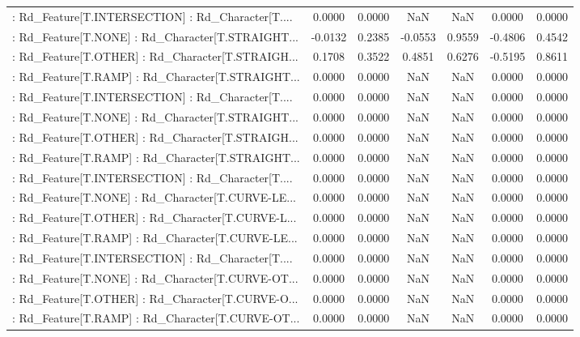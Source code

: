 \begin{longtable}{p{4cm}cccccc}
 : Rd\_Feature[T.INTERSECTION] : Rd\_Character[T.... &  0.0000 &    0.0000 &     NaN &          NaN &  0.0000 &  0.0000 \\
 : Rd\_Feature[T.NONE] : Rd\_Character[T.STRAIGHT... & -0.0132 &    0.2385 & -0.0553 &       0.9559 & -0.4806 &  0.4542 \\
 : Rd\_Feature[T.OTHER] : Rd\_Character[T.STRAIGH... &  0.1708 &    0.3522 &  0.4851 &       0.6276 & -0.5195 &  0.8611 \\
 : Rd\_Feature[T.RAMP] : Rd\_Character[T.STRAIGHT... &  0.0000 &    0.0000 &     NaN &          NaN &  0.0000 &  0.0000 \\
 : Rd\_Feature[T.INTERSECTION] : Rd\_Character[T.... &  0.0000 &    0.0000 &     NaN &          NaN &  0.0000 &  0.0000 \\
 : Rd\_Feature[T.NONE] : Rd\_Character[T.STRAIGHT... &  0.0000 &    0.0000 &     NaN &          NaN &  0.0000 &  0.0000 \\
 : Rd\_Feature[T.OTHER] : Rd\_Character[T.STRAIGH... &  0.0000 &    0.0000 &     NaN &          NaN &  0.0000 &  0.0000 \\
 : Rd\_Feature[T.RAMP] : Rd\_Character[T.STRAIGHT... &  0.0000 &    0.0000 &     NaN &          NaN &  0.0000 &  0.0000 \\
 : Rd\_Feature[T.INTERSECTION] : Rd\_Character[T.... &  0.0000 &    0.0000 &     NaN &          NaN &  0.0000 &  0.0000 \\
 : Rd\_Feature[T.NONE] : Rd\_Character[T.CURVE-LE... &  0.0000 &    0.0000 &     NaN &          NaN &  0.0000 &  0.0000 \\
 : Rd\_Feature[T.OTHER] : Rd\_Character[T.CURVE-L... &  0.0000 &    0.0000 &     NaN &          NaN &  0.0000 &  0.0000 \\
 : Rd\_Feature[T.RAMP] : Rd\_Character[T.CURVE-LE... &  0.0000 &    0.0000 &     NaN &          NaN &  0.0000 &  0.0000 \\
 : Rd\_Feature[T.INTERSECTION] : Rd\_Character[T.... &  0.0000 &    0.0000 &     NaN &          NaN &  0.0000 &  0.0000 \\
 : Rd\_Feature[T.NONE] : Rd\_Character[T.CURVE-OT... &  0.0000 &    0.0000 &     NaN &          NaN &  0.0000 &  0.0000 \\
 : Rd\_Feature[T.OTHER] : Rd\_Character[T.CURVE-O... &  0.0000 &    0.0000 &     NaN &          NaN &  0.0000 &  0.0000 \\
 : Rd\_Feature[T.RAMP] : Rd\_Character[T.CURVE-OT... &  0.0000 &    0.0000 &     NaN &          NaN &  0.0000 &  0.0000 \\

\end{longtable}
